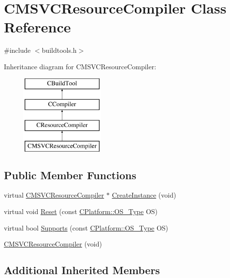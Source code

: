 \hypertarget{classCMSVCResourceCompiler}{\section{C\-M\-S\-V\-C\-Resource\-Compiler Class Reference}
\label{classCMSVCResourceCompiler}
}


{\ttfamily \#include $<$buildtools.\-h$>$}

Inheritance diagram for C\-M\-S\-V\-C\-Resource\-Compiler\-:\begin{figure}[H]
\begin{center}
\leavevmode
\includegraphics[height=4.000000cm]{dd/def/classCMSVCResourceCompiler}
\end{center}
\end{figure}
\subsection*{Public Member Functions}
\begin{DoxyCompactItemize}
\item 
virtual \hyperlink{classCMSVCResourceCompiler}{C\-M\-S\-V\-C\-Resource\-Compiler} $\ast$ \hyperlink{classCMSVCResourceCompiler_aabd1683b76c181322754107af65ed8e0}{Create\-Instance} (void)
\item 
virtual void \hyperlink{classCMSVCResourceCompiler_a0e48cbff3bc0d94803c0b2307317f05b}{Reset} (const \hyperlink{classCPlatform_a2fb735c63c53052f79629e338bb0f535}{C\-Platform\-::\-O\-S\-\_\-\-Type} O\-S)
\item 
virtual bool \hyperlink{classCMSVCResourceCompiler_a5baad5f0696d6d4ee3de3337c8d87e99}{Supports} (const \hyperlink{classCPlatform_a2fb735c63c53052f79629e338bb0f535}{C\-Platform\-::\-O\-S\-\_\-\-Type} O\-S)
\item 
\hyperlink{classCMSVCResourceCompiler_a324f66db57c2b72ef7c7b9a210b84b9f}{C\-M\-S\-V\-C\-Resource\-Compiler} (void)
\end{DoxyCompactItemize}
\subsection*{Additional Inherited Members}


